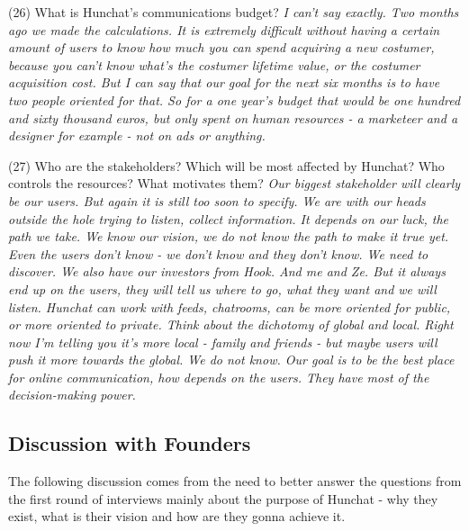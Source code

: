 \documentclass[12pt]{article}
\begin{document}
(26) What is Hunchat’s communications budget? \textit{I can't say exactly. Two months ago we made the calculations. It is extremely difficult without having a certain amount of users to know how much you can spend acquiring a new costumer, because you can't know what's the costumer lifetime value, or the costumer acquisition cost. But I can say that our goal for the next six months is to have two people oriented for that. So for a one year's budget that would be one hundred and sixty thousand euros, but only spent on human resources - a marketeer and a designer for example - not on ads or anything.}

(27) Who are the stakeholders? Which will be most affected by Hunchat? Who controls the resources? What motivates them? \textit{Our biggest stakeholder will clearly be our users. But again it is still too soon to specify. We are with our heads outside the hole trying to listen, collect information. It depends on our luck, the path we take. We know our vision, we do not know the path to make it true yet. Even the users don't know - we don't know and they don't know. We need to discover. We also have our investors from Hook. And me and Ze. But it always end up on the users, they will tell us where to go, what they want and we will listen. Hunchat can work with feeds, chatrooms, can be more oriented for public, or more oriented to private. Think about the dichotomy of global and local. Right now I'm telling you it's more local - family and friends - but maybe users will push it more towards the global. We do not know. Our goal is to be the best place for online communication, how depends on the users. They have most of the decision-making power.}

\subsection {Discussion with Founders}\label{disc}

The following discussion comes from the need to better answer the questions from the first round of interviews mainly about the purpose of Hunchat - why they exist, what is their vision and how are they gonna achieve it. 
\end{document}
